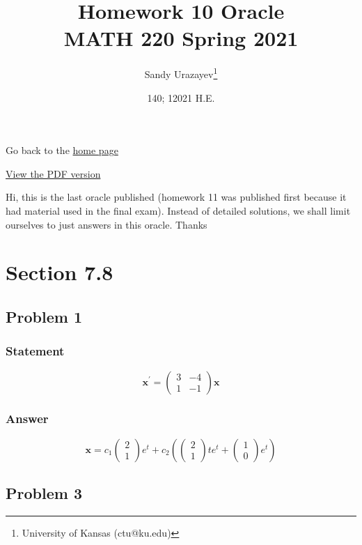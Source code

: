 \documentclass[12pt]{article}
\author{Sandy Urazayev\thanks{University of Kansas (ctu@ku.edu)}}
\date{140; 12021 H.E.}
\title{Homework 10 Oracle\\\medskip
\large MATH 220 Spring 2021}
\begin{document}
\maketitle
Go back to the \href{../../}{home page}

\href{./index.pdf}{View the PDF version​}

Hi, this is the last oracle published (homework 11 was published first because
it had material used in the final exam). Instead of detailed solutions, we shall
limit ourselves to just answers in this oracle. Thanks

\section*{Section 7.8}
\label{sec:orgb1869a7}
\subsection*{Problem 1}
\label{sec:orgcef2791}
\subsubsection*{Statement}
\label{sec:org7f08198}
   \begin{equation*}
\mathbf{x}^{\prime}=\left(\begin{array}{ll}
3 & -4 \\
1 & -1
\end{array}\right) \mathbf{x}
\end{equation*}
\subsubsection*{Answer}
\label{sec:orge091854}
    \begin{equation*}
\mathbf{x}=c_{1}\left(\begin{array}{l}
2 \\
1
\end{array}\right) e^{t}+c_{2}\left(\left(\begin{array}{l}
2 \\
1
\end{array}\right) t e^{t}+\left(\begin{array}{l}
1 \\
0
\end{array}\right) e^{t}\right)
\end{equation*}
\subsection*{Problem 3}
\label{sec:orgad8a7a7}
\end{document}
